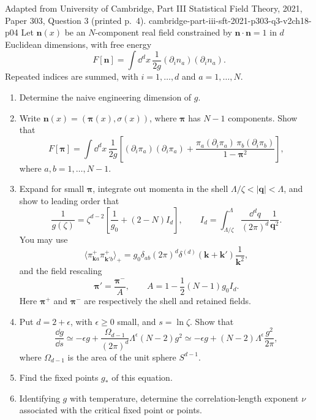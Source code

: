 \begin{enumerate}
  {Adapted from University of Cambridge, Part III Statistical Field Theory,
  2021, Paper 303, Question 3 (printed p.~4).}
  {cambridge-part-iii-sft-2021-p303-q3-v2ch18-p04}
  Let \(\mathbf n(x)\) be an \(N\)-component real field constrained by
  \(\mathbf n\cdot\mathbf n=1\) in \(d\) Euclidean dimensions, with free
  energy
  \[
    F[\mathbf n]=\int \dd^dx\,\frac{1}{2g}
      (\partial_i n_a)(\partial_i n_a).
  \]
  Repeated indices are summed, with \(i=1,\ldots,d\) and
  \(a=1,\ldots,N\).
  \begin{enumerate}
    \item[(a)] Determine the naive engineering dimension of \(g\).
    \item[(b)] Write
    \(\mathbf n(x)=(\boldsymbol\pi(x),\sigma(x))\), where
    \(\boldsymbol\pi\) has \(N-1\) components.  Show that
    \[
      F[\boldsymbol\pi]=\int \dd^dx\,\frac{1}{2g}\left[
        (\partial_i\pi_a)(\partial_i\pi_a)
        +\frac{\pi_a(\partial_i\pi_a)\,
          \pi_b(\partial_i\pi_b)}{1-\boldsymbol\pi^2}
      \right],
    \]
    where \(a,b=1,\ldots,N-1\).
    \item[(c)] Expand for small \(\boldsymbol\pi\), integrate out momenta
    in the shell \(\Lambda/\zeta<|\mathbf q|<\Lambda\), and show to leading
    order that
    \[
      \frac{1}{g(\zeta)}=\zeta^{d-2}\left[
        \frac{1}{g_0}+(2-N)I_d
      \right],
      \qquad
      I_d=\int_{\Lambda/\zeta}^{\Lambda}
        \frac{\dd^dq}{(2\pi)^d}\frac{1}{\mathbf q^2}.
    \]
    You may use
    \[
      \bigl\langle\pi_{\mathbf k a}^{+}
        \pi_{\mathbf k'b}^{+}\bigr\rangle_+
      =g_0\delta_{ab}(2\pi)^d
        \delta^{(d)}(\mathbf k+\mathbf k')\frac{1}{\mathbf k^2},
    \]
    and the field rescaling
    \[
      \boldsymbol\pi'=\frac{\boldsymbol\pi^-}{A},
      \qquad
      A=1-\frac12(N-1)g_0I_d.
    \]
    Here \(\boldsymbol\pi^+\) and \(\boldsymbol\pi^-\) are respectively
    the shell and retained fields.
    \item[(d)] Put \(d=2+\epsilon\), with \(\epsilon\geq0\) small, and
    \(s=\ln\zeta\).  Show that
    \[
      \frac{\dd g}{\dd s}\simeq-\epsilon g
        +\frac{\Omega_{d-1}}{(2\pi)^d}\Lambda^\epsilon(N-2)g^2
      \simeq-\epsilon g+(N-2)\Lambda^\epsilon\frac{g^2}{2\pi},
    \]
    where \(\Omega_{d-1}\) is the area of the unit sphere
    \(S^{d-1}\).
    \item[(e)] Find the fixed points \(g_*\) of this equation.
    \item[(f)] Identifying \(g\) with temperature, determine the
    correlation-length exponent \(\nu\) associated with the critical fixed
    point or points.
  \end{enumerate}


\end{enumerate}

